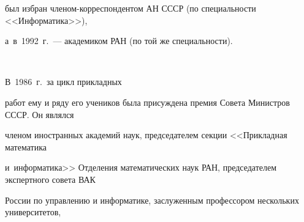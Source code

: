 был избран членом-корреспондентом АН СССР (по специальности <<Информатика>>), 


а~в~1992~г.~--- академиком РАН (по той же специальности).\linebreak\vspace*{-12pt}





\pagebreak





\





\vspace*{-46pt}





\noindent







 \thispagestyle{empty}





\noindent


В~1986~г.\ за цикл прикладных 


работ ему и ряду его учеников была при\-суж\-де\-на премия Совета Министров СССР. Он являлся 


членом иностранных академий наук, председателем секции <<Прикладная математика


 и~информатика>> Отделения математических наук РАН, председателем экспертного совета ВАК 


России по управ\-ле\-нию и информатике, заслуженным профессором нескольких университетов, 


